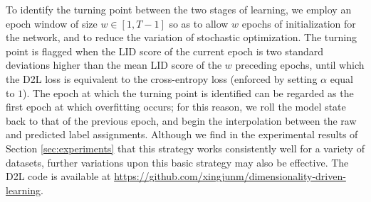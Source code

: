 \documentclass{article}
\begin{document}

To identify the turning point between the two stages of learning, we employ an epoch window of size $w \in [1, T-1]$ so as to allow $w$ epochs of initialization for the network, and to reduce the variation of stochastic optimization. The turning point is flagged when the LID score of the current epoch is two standard deviations higher than the mean LID score of the $w$ preceding epochs, until which the D2L loss is equivalent to the cross-entropy loss (enforced by setting $\alpha$ equal to $1$). The epoch at which the turning point is identified can be regarded as the first epoch at which overfitting occurs; for this reason, we roll the model state back to that of the previous epoch, and begin the interpolation between the raw and predicted label assignments. 
Although we find in the experimental results of Section \ref{sec:experiments} that this strategy works consistently well for a variety of datasets, further variations upon this basic strategy may also be effective. The D2L code is available at \url{https://github.com/xingjunm/dimensionality-driven-learning}.
\end{document}
